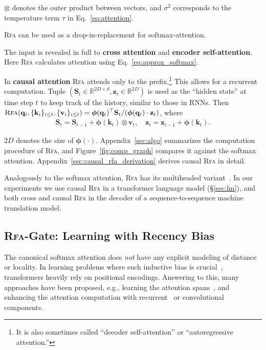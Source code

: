  
$\otimes$ denotes the outer product between vectors, and $\sigma^2$ corresponds to the temperature term $\tau$ in Eq.~\ref{eq:attention}.

\textsc{Rfa} can be used as a drop-in-replacement for softmax-attention.

\begin{compactitem}
\item[(a)] The input is revealed in full to \textbf{cross attention} and \textbf{encoder self-attention}. {Here \textsc{Rfa} calculates attention using Eq.~\ref{eq:approx_softmax}}.
\item[(b)]
In \textbf{causal attention} \textsc{Rfa} attends only to the prefix.\footnote{
It is also sometimes called ``decoder self-attention'' or ``autoregressive attention.'' } This allows for a recurrent computation. Tuple $({\mathbf{S}}_t\in\mathbb{R}^{2D\times d},{\mathbf{z}}_t\in\mathbb{R}^{2D})$
is used as the ``hidden state'' at time step $t$ to keep track of the history, similar to those in RNNs. Then
$\textsc{Rfa}({\mathbf{q}}_t,\{{\mathbf{k}}_i\}_{i\leq t},\{{\mathbf{v}}_i\}_{i\leq t}) = \boldsymbol{\phi}({\mathbf{q}}_t)^\top{\mathbf{S}}_t / (\boldsymbol{\phi}({\mathbf{q}}_t)\cdot{\mathbf{z}}_t)$, 
where
\begin{align}\label{eq:linear_causal}
    {\mathbf{S}}_t = {\mathbf{S}}_{t-1} +  \boldsymbol{\phi}\left({\mathbf{k}}_t\right)\otimes{\mathbf{v}}_t, \quad
    {\mathbf{z}}_t = {\mathbf{z}}_{t-1} + \boldsymbol{\phi}\left({\mathbf{k}}_t\right).
\end{align}
\end{compactitem}

{$2D$ denotes the size of $\boldsymbol{\phi}(\boldsymbol{\cdot}).$}
Appendix~\ref{sec:algo} summarizes the computation procedure of \textsc{Rfa},
and Figure~\ref{fig:comp_graph} compares it against the softmax attention.
Appendix~\ref{sec:causal_rfa_derivation} derives causal \textsc{Rfa} in detail.

Analogously to the softmax attention, \textsc{Rfa} has its multiheaded variant~\citep{vaswani2017attention}. In our experiments we use causal \textsc{Rfa} in a transformer language model (\S\ref{sec:lm}), and both cross and causal \textsc{Rfa} in the decoder of a sequence-to-sequence machine translation model. 

\subsection{\textsc{Rfa}-Gate: Learning with Recency Bias}\label{sec:gate}
The canonical softmax attention does \emph{not} have any explicit modeling of distance or locality. In learning problems where such inductive bias is crucial~\citep[\emph{inter alia}]{ ba2016using,parmar2018image,thomas2018differentiable,li2019enhancing}, transformers heavily rely on positional encodings. Answering to this, many approaches have been proposed, e.g., learning the attention spans~\citep{sukhbaatar2019adaptive,wu2020Lite}, and enhancing the attention computation with recurrent~\citep{hao2019modeling,chen2019recurrent} or convolutional~\citep{wu2018pay,mohamed2019transformers} components.

